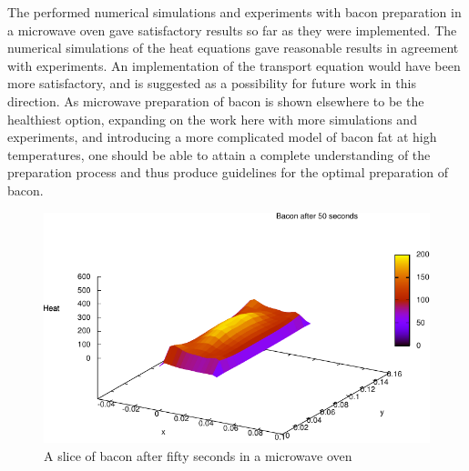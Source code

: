 \documentclass[final,hyperref={pdfpagelabels=false}]{beamer}
\begin{document}
\begin{frame}{}
\begin{columns}[t]
\begin{column}{.97\textwidth}
\begin{multicols}{2}
    The performed numerical simulations and experiments with bacon preparation
in a microwave oven gave satisfactory results so far as they were implemented.
The numerical simulations of the heat equations gave reasonable results in agreement
with experiments. An implementation of the transport equation would have been
more satisfactory, and is suggested as a possibility for future work in this
direction. As microwave preparation of bacon is shown elsewhere to be the
healthiest option, expanding on the work here with more simulations and
experiments, and introducing a more complicated model of bacon fat at high
temperatures, one should be able to attain a complete understanding of the
preparation process and thus produce guidelines for the optimal preparation of
bacon.


\begin{figure}[!h]
  \begin{center}
    \includegraphics[width=\linewidth]{bacon-50sec.pdf}
  \end{center}
  \caption{A slice of bacon after fifty seconds in a microwave oven}
  \label{fig:bacon-50sec}
\end{figure}


    \end{multicols}



  \end{column}
  \end{columns}
  \end{frame}
\end{document}
